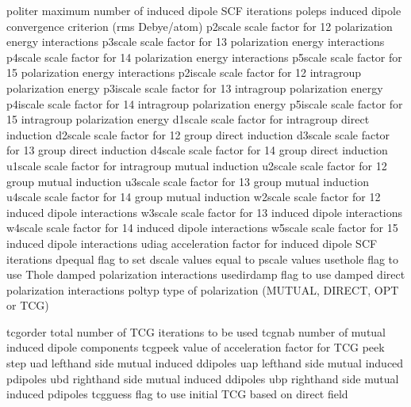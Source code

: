 \documentclass[letterpaper,11pt,english]{sphinxmanual}
\begin{document}

\begin{sphinxVerbatim}[commandchars=\\\{\}]
politer         maximum number of induced dipole SCF iterations
poleps          induced dipole convergence criterion (rms Debye/atom)
p2scale         scale factor for 1\PYGZhy{}2 polarization energy interactions
p3scale         scale factor for 1\PYGZhy{}3 polarization energy interactions
p4scale         scale factor for 1\PYGZhy{}4 polarization energy interactions
p5scale         scale factor for 1\PYGZhy{}5 polarization energy interactions
p2iscale        scale factor for 1\PYGZhy{}2 intragroup polarization energy
p3iscale        scale factor for 1\PYGZhy{}3 intragroup polarization energy
p4iscale        scale factor for 1\PYGZhy{}4 intragroup polarization energy
p5iscale        scale factor for 1\PYGZhy{}5 intragroup polarization energy
d1scale         scale factor for intra\PYGZhy{}group direct induction
d2scale         scale factor for 1\PYGZhy{}2 group direct induction
d3scale         scale factor for 1\PYGZhy{}3 group direct induction
d4scale         scale factor for 1\PYGZhy{}4 group direct induction
u1scale         scale factor for intra\PYGZhy{}group mutual induction
u2scale         scale factor for 1\PYGZhy{}2 group mutual induction
u3scale         scale factor for 1\PYGZhy{}3 group mutual induction
u4scale         scale factor for 1\PYGZhy{}4 group mutual induction
w2scale         scale factor for 1\PYGZhy{}2 induced dipole interactions
w3scale         scale factor for 1\PYGZhy{}3 induced dipole interactions
w4scale         scale factor for 1\PYGZhy{}4 induced dipole interactions
w5scale         scale factor for 1\PYGZhy{}5 induced dipole interactions
udiag           acceleration factor for induced dipole SCF iterations
dpequal         flag to set dscale values equal to pscale values
use\PYGZus{}thole       flag to use Thole damped polarization interactions
use\PYGZus{}dirdamp     flag to use damped direct polarization interactions
poltyp          type of polarization (MUTUAL, DIRECT, OPT or TCG)
\end{sphinxVerbatim}


\begin{sphinxVerbatim}[commandchars=\\\{\}]
tcgorder        total number of TCG iterations to be used
tcgnab          number of mutual induced dipole components
tcgpeek         value of acceleration factor for TCG peek step
uad             left\PYGZhy{}hand side mutual induced d\PYGZhy{}dipoles
uap             left\PYGZhy{}hand side mutual induced p\PYGZhy{}dipoles
ubd             right\PYGZhy{}hand side mutual induced d\PYGZhy{}dipoles
ubp             right\PYGZhy{}hand side mutual induced p\PYGZhy{}dipoles
tcgguess        flag to use initial TCG based on direct field
\end{sphinxVerbatim}
\end{document}
